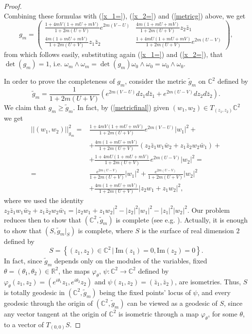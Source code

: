 \documentclass[11pt, reqno]{amsart}
\begin{document}
\begin{proof}
\begin{equation}
\end{equation}
Combining these formulas with (\ref{x_1=}), (\ref{x_2=}) and (\ref{metricg}) above, we get
\begin{equation}\label{metricfinal}
g_m=\left(
\begin{array}{cc}
\frac{1+4mV(1+mU+mV)}{1+2m(U+V)}e^{2m(V-U)}  &\frac{4m(1+mU+mV)}{1+2m(U+V)}z_2 \bar z_1 \\
\frac{4m(1+mU+mV)}{1+2m(U+V)}z_1\bar z_2 & \frac{1+4mU(1+mU+mV)}{1+2m(U+V)}e^{2m(U-V)}
\end{array}
\right),
\end{equation}
from which follows easily, substituting again (\ref{x_1=}) and (\ref{x_2=}), that $\det (g_m)=1$, i.e.
$\omega_m\wedge \omega_m=\det (g_m)\omega_0\wedge\omega_0=\omega_0\wedge\omega_0$.

In order to prove the completeness of $g_m$, consider the metric $\tilde g_m$ on ${\mathbb{C}}^2$ defined by
$$\tilde g_m=\frac{1}{1+2m (U+V)}\left(e^{2m(V-U)}dz_1d\bar z_1+e^{2m(U-V)}dz_2d\bar z_2\right).$$
We claim that $g_m\geq \tilde g_m$. In fact, by (\ref{metricfinal}) given $(w_1,w_2)\in T_{(z_1,z_2)}{\mathbb{C}}^2$ we get
\begin{equation}
\begin{split}
||(w_1,w_2)||_{g_m}^2=&\frac{1+4mV(1+mU+mV)}{1+2m(U+V)}e^{2m(V-U)} |w_1|^2+\\
&+\frac{4m(1+mU+mV)}{1+2m(U+V)}(z_2\bar z_1w_1\bar w_2+z_1\bar z_2w_2\bar w_1)+\\
&+\frac{1+4mU(1+mU+mV)}{1+2m(U+V)}e^{2m(U-V)}|w_2|^2=\\
=&\frac{e^{2m(U-V)}}{1+2m(U+V)} |w_1|^2+\frac{e^{2m(U-V)}}{1+2m(U+V)}|w_2|^2\\
&+\frac{4m(1+mU+mV)}{1+2m(U+V)}|z_2w_1+z_1w_2|^2,
\end{split}\nonumber
\end{equation}
where we used the identity $z_2\bar z_1 w_1\bar w_2+z_1\bar z_2 w_2\bar w_1=|z_2w_1+z_1w_2|^2-|z_2|^2|w_1|^2-|z_1|^2|w_2|^2$. Our problem reduces then to show that $({\mathbb{C}}^2,\tilde g_m)$ is complete (see e.g. \cite[Ex. 7 p. 153]{docarmo}). Actually, it is enough to show that $(S, \tilde g_m|_S)$ is complete, where $S$ is the surface of real dimension $2$ defined by $$S=\left\{(z_1,z_2)\in{\mathbb{C}}^2\,|\ \mathrm{Im}(z_1)=0,\mathrm{Im}(z_2)=0\right\}.$$ In fact, since $\tilde g_m$ depends only on the modules of the variables, fixed $\theta=(\theta_1,\theta_2)\in{\mathbb{R}}^2$, the maps $\varphi_\theta$, $\psi\!:{\mathbb{C}}^2{\rightarrow}{\mathbb{C}}^2$ defined by $\varphi_\theta(z_1,z_2)=(e^{i\theta_1}z_1,e^{i\theta_2}z_2)$ and $\psi(z_1,z_2)= (\bar z_1, \bar z_2)$, are isometries. Thus, $S$ is totally geodesic in $({\mathbb{C}}^2,\tilde g_m)$ being the fixed points' locus of $\psi$, and every geodesic through the origin of $({\mathbb{C}}^2,\tilde g_m)$ can be viewed as a geodesic of $S$, since any vector tangent at the origin of ${\mathbb{C}}^2$ is isometric through a map $\varphi_\theta$, for some $\theta$, to a vector of $T_{(0,0)}S$.


\end{proof}
\end{document}
